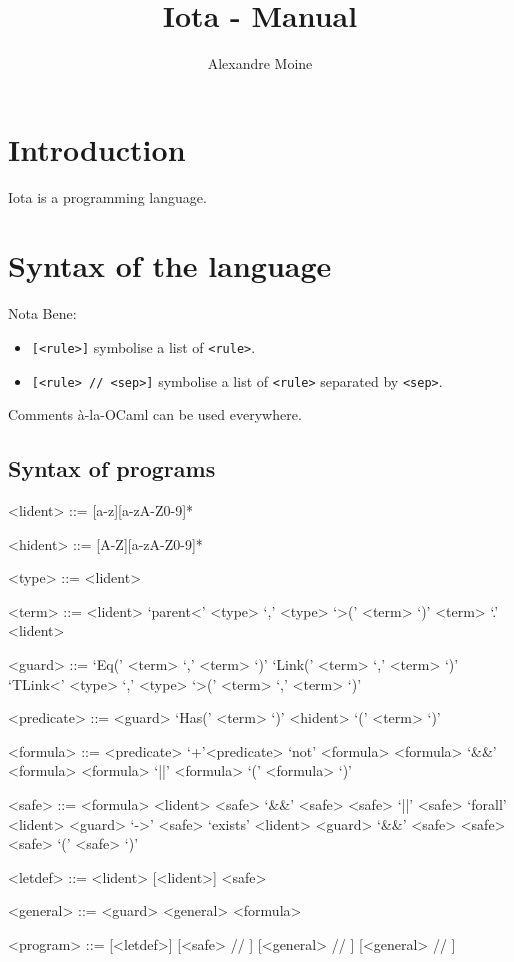 \documentclass[10pt,a4paper]{article}
\author{Alexandre Moine}
\title{Iota - Manual}
\begin{document}
\maketitle
\tableofcontents

\section{Introduction}
Iota is a programming language.

\section{Syntax of the language}
Nota Bene:
\begin{itemize}
\item \verb|[<rule>]| symbolise a list of \verb|<rule>|.
\item \verb|[<rule> // <sep>]| symbolise a list of \verb|<rule>| separated by \verb|<sep>|.
\end{itemize}

Comments à-la-OCaml can be used everywhere.

\subsection{Syntax of programs}

\begin{grammar}
  <lident> ::= [a-z][a-zA-Z0-9]*

  <hident> ::= [A-Z][a-zA-Z0-9]*

  <type> ::= <lident>

  <term> ::= <lident>
  \alt `parent<' <type> `,' <type> `>(' <term> `)'
  \alt <term> `.' <lident>

  <guard> ::= `Eq(' <term> `,' <term> `)'
  \alt `Link(' <term> `,' <term> `)'
  \alt `TLink<' <type> `,' <type> `>(' <term> `,' <term> `)'

  <predicate> ::= <guard>
  \alt `Has(' <term> `)'
  \alt <hident> `(' <term> `)'

  <formula> ::= <predicate>
  \alt `+'<predicate>
  \alt `not' <formula>
  \alt <formula> `&&' <formula>
  \alt <formula> `||' <formula>
  \alt `(' <formula> `)'

  <safe> ::= <formula>
  \alt <lident>
  \alt <safe> `&&' <safe>
  \alt <safe> `||' <safe>
  \alt `forall' <lident> <guard> `->' <safe>
  \alt `exists' <lident> <guard> `&&' <safe>
  \alt <safe> <safe>
  \alt `(' <safe> `)'

  <letdef> ::=  <lident> [<lident>] \lit{=} <safe>

  <general> ::=
  <guard> \lit{->} <general>
  \alt \lit{=>} <formula>

  <program> ::=
  [<letdef>]  [<safe> // \lit{;}]  [<general> // \lit{;}]  [<general> // \lit{;}]

\end{grammar}
\end{document}
